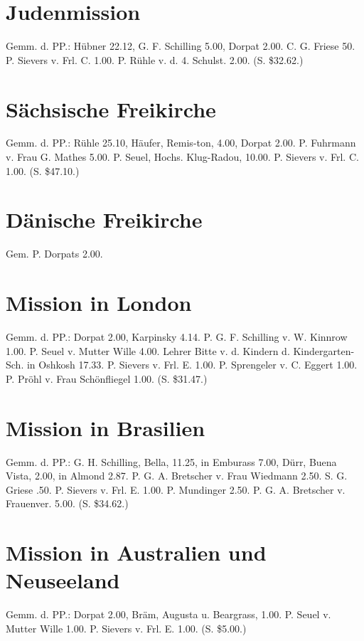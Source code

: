 \section{Judenmission}

Gemm. d. PP.: Hübner 22.12, G. F. Schilling 5.00, Dorpat 2.00. C. G. Friese 50. P. Sievers v. Frl. C. 1.00. P. Rühle v. d. 4. Schulst. 2.00. (S. \$32.62.)

\section{Sächsische Freikirche}

Gemm. d. PP.: Rühle 25.10, Häufer, Remis-ton, 4.00, Dorpat 2.00. P. Fuhrmann v. Frau G. Mathes 5.00. P. Seuel, Hochs. Klug-Radou, 10.00. P. Sievers v. Frl. C. 1.00. (S. \$47.10.)

\section{Dänische Freikirche}

Gem. P. Dorpats 2.00.

\section{Mission in London}

Gemm. d. PP.: Dorpat 2.00, Karpinsky 4.14.
P. G. F. Schilling v. W. Kinnrow 1.00. P. Seuel v. Mutter Wille 4.00. Lehrer Bitte v. d. Kindern d. Kindergarten-Sch. in Oshkosh 17.33. P. Sievers v. Frl. E. 1.00. P. Sprengeler v. C. Eggert 1.00. P. Pröhl v. Frau Schönfliegel 1.00. (S. \$31.47.)

\section{Mission in Brasilien}

Gemm. d. PP.: G. H. Schilling, Bella, 11.25, in Emburass 7.00, Dürr, Buena Vista, 2.00, in Almond 2.87. P. G. A. Bretscher v. Frau Wiedmann 2.50. S. G. Griese .50. P. Sievers v. Frl. E. 1.00. P. Mundinger 2.50. P. G. A. Bretscher v. Frauenver. 5.00. (S. \$34.62.)

\section{Mission in Australien und Neuseeland}

Gemm. d. PP.: Dorpat 2.00, Bräm, Augusta u. Beargrass, 1.00. P. Seuel v. Mutter Wille 1.00. P. Sievers v. Frl. E. 1.00. (S. \$5.00.)

